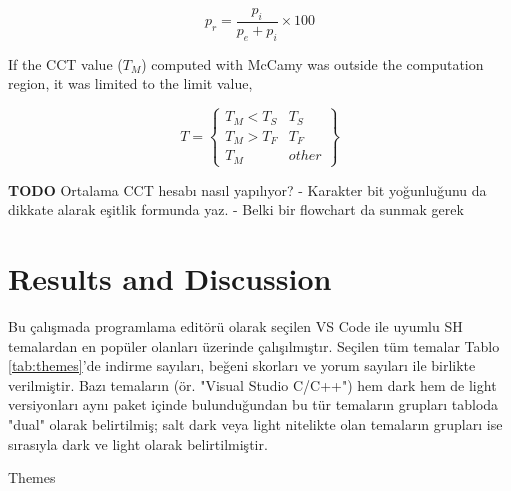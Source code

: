 \documentclass{article}
\begin{document}
\begin{equation}
p_r = \frac{p_i}{p_e + p_i} \times 100
\label{eq:pr}
\end{equation}

If the CCT value ($T_M$) computed with McCamy was outside the computation region, it was limited to the limit value,

\begin{equation}
T = \left \{ 
\begin{matrix}
T_M < T_S & T_S\\
T_M > T_F & T_F\\
T_M & other
\end{matrix}
\right \}
\label{eq:TS_TF}
\end{equation}

\textbf{TODO} Ortalama CCT hesabı nasıl yapılıyor?
- Karakter bit yoğunluğunu da dikkate alarak eşitlik formunda yaz.
- Belki bir flowchart da sunmak gerek

\section{Results and Discussion}

Bu çalışmada programlama editörü olarak seçilen VS Code ile uyumlu SH temalardan en popüler olanları üzerinde
çalışılmıştır.  Seçilen tüm temalar Tablo \ref{tab:themes}'de indirme sayıları, beğeni skorları ve yorum sayıları ile
birlikte verilmiştir.  Bazı temaların (ör. "Visual Studio C/C++") hem dark hem de light versiyonları aynı paket içinde
bulunduğundan bu tür temaların grupları tabloda "dual" olarak belirtilmiş; salt dark veya light nitelikte olan temaların
grupları ise sırasıyla dark ve light olarak belirtilmiştir.


\begin{table}[H]

  \caption{Themes}
  \label{tab:themes}
\end{table}
\end{document}
